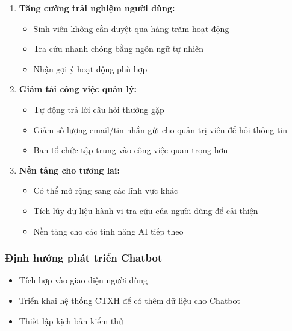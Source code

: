 \begin{enumerate}
    \item \textbf{Tăng cường trải nghiệm người dùng:}
        \begin{itemize}
            \item Sinh viên không cần duyệt qua hàng trăm hoạt động
            \item Tra cứu nhanh chóng bằng ngôn ngữ tự nhiên
            \item Nhận gợi ý hoạt động phù hợp
        \end{itemize}
        
    \item \textbf{Giảm tải công việc quản lý:}
        \begin{itemize}
            \item Tự động trả lời câu hỏi thường gặp
            \item Giảm số lượng email/tin nhắn gửi cho quản trị viên để hỏi thông tin
            \item Ban tổ chức tập trung vào công việc quan trọng hơn
        \end{itemize}

    \item \textbf{Nền tảng cho tương lai:}
        \begin{itemize}
            \item Có thể mở rộng sang các lĩnh vực khác
            \item Tích lũy dữ liệu hành vi tra cứu của người dùng để cải thiện
            \item Nền tảng cho các tính năng AI tiếp theo
        \end{itemize}
\end{enumerate}

\subsubsection{Định hướng phát triển Chatbot}
\begin{itemize}
    \item Tích hợp vào giao diện người dùng
    \item Triển khai hệ thống CTXH để có thêm dữ liệu cho Chatbot
    \item Thiết lập kịch bản kiểm thử
\end{itemize}